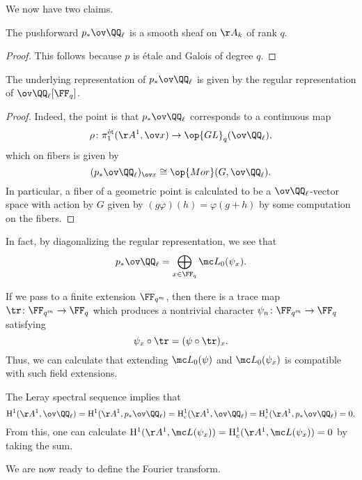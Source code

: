 \documentclass[../notes.tex]{subfiles}
\begin{document}
We now have two claims.
\begin{lemma}
	The pushforward $p_*\ov\QQ_\ell$ is a smooth sheaf on $\AA_k$ of rank $q$.
\end{lemma}
\begin{proof}
	This follows because $p$ is \'etale and Galois of degree $q$.
\end{proof}
\begin{lemma}
	The underlying representation of $p_*\ov\QQ_\ell$ is given by the regular representation of $\ov\QQ_\ell[\FF_q]$.
\end{lemma}
\begin{proof}
	Indeed, the point is that $p_*\ov\QQ_\ell$ corresponds to a continuous map
	\[\rho\colon\pi_1^{\mathrm{\acute et}}(\AA^1,\ov x)\to\op{GL}_q(\ov\QQ_\ell),\]
	which on fibers is given by
	\[(p_*\ov\QQ_\ell)_{\ov x}\cong\op{Mor}(G,\ov\QQ_\ell).\]
	In particular, a fiber of a geometric point is calculated to be a $\ov\QQ_\ell$-vector space with action by $G$ given by $(g\varphi)(h)=\varphi(g+h)$ by some computation on the fibers.
\end{proof}
\begin{remark} \label{rem:diagonalize-regular}
	In fact, by diagonalizing the regular representation, we see that
	\[p_*\ov\QQ_\ell=\bigoplus_{x\in\FF_q}\mc L_0(\psi_x).\]
\end{remark}
\begin{remark}
	If we pass to a finite extension $\FF_{q^m}$, then there is a trace map $\tr\colon\FF_{q^m}\to\FF_q$ which produces a nontrivial character $\psi_n\colon\FF_{q^m}\to\FF_q$ satisfying
	\[\psi_x\circ{\tr}=(\psi\circ{\tr})_x.\]
	Thus, we can calculate that extending $\mc L_0(\psi)$ and $\mc L_0(\psi_x)$ is compatible with such field extensions.
\end{remark}
\begin{remark}
	The Leray spectral sequence implies that
	\[\mathrm H^1(\AA^1,\ov\QQ_\ell)=\mathrm H^1(\AA^1,p_*\ov\QQ_\ell)=\mathrm H^1_c(\AA^1,\ov\QQ_\ell)=\mathrm H^1_c(\AA^1,p_*\ov\QQ_\ell)=0.\]
	From this, one can calculate $\mathrm H^1(\AA^1,\mc L(\psi_x))=\mathrm H^1_c(\AA^1,\mc L(\psi_x))=0$ by taking the sum.
\end{remark}
We are now ready to define the Fourier transform.
\end{document}
